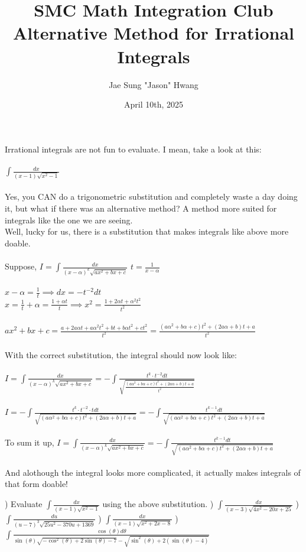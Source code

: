 \documentclass[11pt]{article}
\title{SMC Math Integration Club\\Alternative Method for Irrational Integrals}
\author{Jae Sung "Jason" Hwang}
\date{April 10th, 2025}
\begin{document}
\maketitle

\pagebreak
{Irrational integrals are not fun to evaluate. I mean, take a look at this:} \\
\\${\displaystyle \int \frac{dx}{(x-1)\sqrt{x^{2}-1}} }$ \\
\\ {Yes, you CAN do a trigonometric substitution and completely waste a day doing it, but what if there was an alternative method? A method more suited for integrals like the one we are seeing.}
\\ {Well, lucky for us, there is a substitution that makes integrals like above more doable.} \\
\\ {Suppose, } ${\displaystyle I = \int \frac{dx}{(x-\alpha)^{k}\sqrt{ax^{2}+bx+c}}}$  ${\displaystyle t = \frac{1}{x-\alpha}}$ \\
\\ ${\displaystyle x-\alpha = \frac{1}{t} \implies dx = -t^{-2} dt}$
\\ ${\displaystyle x = \frac{1}{t} + \alpha = \frac{1+\alpha t}{t} \implies x^{2} = \frac{1+2\alpha t+\alpha^{2}t^{2}}{t^{2}}}$ \\
\\ ${\displaystyle ax^{2} + bx + c = \frac{a+2a\alpha t + a\alpha^{2}t^{2}+bt+b\alpha t^{2} +ct^{2}}{t^{2}} = \frac{(a\alpha^{2}+b\alpha + c)t^{2}+(2a\alpha+b)t+a}{t^{2}}}$ \\
\\ {With the correct substitution, the integral should now look like: } \\
\\ ${\displaystyle I = \int \frac{dx}{(x-\alpha)^{k}\sqrt{ax^{2}+bx+c}} = -\int \frac{t^{k} \cdot t^{-2} dt}{\sqrt{\frac{(a\alpha^{2}+b\alpha + c)t^{2}+(2a\alpha+b)t+a}{t^{2}}}}}$ \\
\\ ${\displaystyle I = -\int \frac{t^{k} \cdot t^{-2} \cdot t dt}{\sqrt{(a\alpha^{2}+b\alpha + c)t^{2}+(2a\alpha+b)t+a}} = -\int \frac{t^{k-1} dt}{\sqrt{(a\alpha^{2}+b\alpha + c)t^{2}+(2a\alpha+b)t+a}}}$ \\
\\ {To sum it up, } ${\displaystyle I = \int \frac{dx}{(x-\alpha)^{k}\sqrt{ax^{2}+bx+c}} = -\int \frac{t^{k-1} dt}{\sqrt{(a\alpha^{2}+b\alpha + c)t^{2}+(2a\alpha+b)t+a}}}$ \\
\\ {And alothough the integral looks more complicated, it actually makes integrals of that form doable!} 

) {Evaluate } ${\displaystyle \int \frac{dx}{(x-1)\sqrt{x^{2}-1}} }$ {using the above substitution.} ) ${\displaystyle \int \frac{dx}{(x-3)\sqrt{4x^{2}-20x+25}} }$ ) ${\displaystyle \int \frac{du}{(u-7)^{3}\sqrt{25u^{2}-370u+1369}} }$ ) ${\displaystyle \int \frac{dx}{(x-1)\sqrt{x^{2}+2x-8}} }$ ) ${\displaystyle \int \frac{\cos(\theta) d\theta}{\sin(\theta)\sqrt{-\cos^{2}(\theta)+2\sin(\theta)-7}-\sqrt{\sin^2(\theta)+2(\sin(\theta)-4)}} }$
\end{document}
